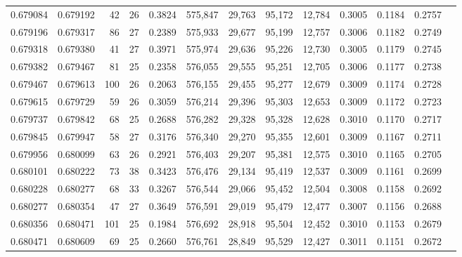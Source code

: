 \begin{tabular}{rrrrrrrrrrrrr}
0.679084 & 0.679192 &  42 &  26 &                                     0.3824 & 575,847 &  29,763 &  95,172 &  12,784 & 0.3005 & 0.1184 & 0.2757 \\
0.679196 & 0.679317 &  86 &  27 &                                     0.2389 & 575,933 &  29,677 &  95,199 &  12,757 & 0.3006 & 0.1182 & 0.2749 \\
0.679318 & 0.679380 &  41 &  27 &                                     0.3971 & 575,974 &  29,636 &  95,226 &  12,730 & 0.3005 & 0.1179 & 0.2745 \\
0.679382 & 0.679467 &  81 &  25 &                                     0.2358 & 576,055 &  29,555 &  95,251 &  12,705 & 0.3006 & 0.1177 & 0.2738 \\
0.679467 & 0.679613 & 100 &  26 &                                     0.2063 & 576,155 &  29,455 &  95,277 &  12,679 & 0.3009 & 0.1174 & 0.2728 \\
0.679615 & 0.679729 &  59 &  26 &                                     0.3059 & 576,214 &  29,396 &  95,303 &  12,653 & 0.3009 & 0.1172 & 0.2723 \\
0.679737 & 0.679842 &  68 &  25 &                                     0.2688 & 576,282 &  29,328 &  95,328 &  12,628 & 0.3010 & 0.1170 & 0.2717 \\
0.679845 & 0.679947 &  58 &  27 &                                     0.3176 & 576,340 &  29,270 &  95,355 &  12,601 & 0.3009 & 0.1167 & 0.2711 \\
0.679956 & 0.680099 &  63 &  26 &                                     0.2921 & 576,403 &  29,207 &  95,381 &  12,575 & 0.3010 & 0.1165 & 0.2705 \\
0.680101 & 0.680222 &  73 &  38 &                                     0.3423 & 576,476 &  29,134 &  95,419 &  12,537 & 0.3009 & 0.1161 & 0.2699 \\
0.680228 & 0.680277 &  68 &  33 &                                     0.3267 & 576,544 &  29,066 &  95,452 &  12,504 & 0.3008 & 0.1158 & 0.2692 \\
0.680277 & 0.680354 &  47 &  27 &                                     0.3649 & 576,591 &  29,019 &  95,479 &  12,477 & 0.3007 & 0.1156 & 0.2688 \\
0.680356 & 0.680471 & 101 &  25 &                                     0.1984 & 576,692 &  28,918 &  95,504 &  12,452 & 0.3010 & 0.1153 & 0.2679 \\
0.680471 & 0.680609 &  69 &  25 &                                     0.2660 & 576,761 &  28,849 &  95,529 &  12,427 & 0.3011 & 0.1151 & 0.2672 \\

\end{tabular}

